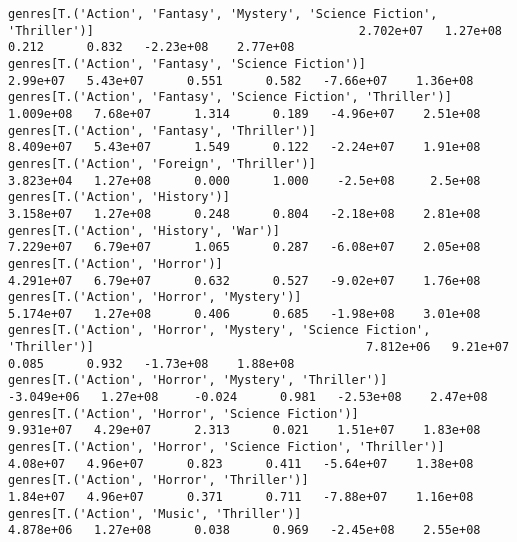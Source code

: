 \documentclass[11pt]{article}
\begin{document}
\begin{Verbatim}[commandchars=\\\{\}]
genres[T.('Action', 'Fantasy', 'Mystery', 'Science Fiction', 'Thriller')]                                     2.702e+07   1.27e+08      0.212      0.832   -2.23e+08    2.77e+08
genres[T.('Action', 'Fantasy', 'Science Fiction')]                                                             2.99e+07   5.43e+07      0.551      0.582   -7.66e+07    1.36e+08
genres[T.('Action', 'Fantasy', 'Science Fiction', 'Thriller')]                                                1.009e+08   7.68e+07      1.314      0.189   -4.96e+07    2.51e+08
genres[T.('Action', 'Fantasy', 'Thriller')]                                                                   8.409e+07   5.43e+07      1.549      0.122   -2.24e+07    1.91e+08
genres[T.('Action', 'Foreign', 'Thriller')]                                                                   3.823e+04   1.27e+08      0.000      1.000    -2.5e+08     2.5e+08
genres[T.('Action', 'History')]                                                                               3.158e+07   1.27e+08      0.248      0.804   -2.18e+08    2.81e+08
genres[T.('Action', 'History', 'War')]                                                                        7.229e+07   6.79e+07      1.065      0.287   -6.08e+07    2.05e+08
genres[T.('Action', 'Horror')]                                                                                4.291e+07   6.79e+07      0.632      0.527   -9.02e+07    1.76e+08
genres[T.('Action', 'Horror', 'Mystery')]                                                                     5.174e+07   1.27e+08      0.406      0.685   -1.98e+08    3.01e+08
genres[T.('Action', 'Horror', 'Mystery', 'Science Fiction', 'Thriller')]                                      7.812e+06   9.21e+07      0.085      0.932   -1.73e+08    1.88e+08
genres[T.('Action', 'Horror', 'Mystery', 'Thriller')]                                                        -3.049e+06   1.27e+08     -0.024      0.981   -2.53e+08    2.47e+08
genres[T.('Action', 'Horror', 'Science Fiction')]                                                             9.931e+07   4.29e+07      2.313      0.021    1.51e+07    1.83e+08
genres[T.('Action', 'Horror', 'Science Fiction', 'Thriller')]                                                  4.08e+07   4.96e+07      0.823      0.411   -5.64e+07    1.38e+08
genres[T.('Action', 'Horror', 'Thriller')]                                                                     1.84e+07   4.96e+07      0.371      0.711   -7.88e+07    1.16e+08
genres[T.('Action', 'Music', 'Thriller')]                                                                     4.878e+06   1.27e+08      0.038      0.969   -2.45e+08    2.55e+08

\end{Verbatim}
\end{document}
